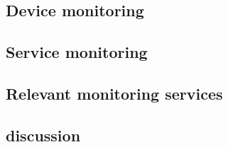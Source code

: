 

\subsection{Device monitoring}

\subsection{Service monitoring}

\subsection{Relevant monitoring services}

\subsection{discussion}